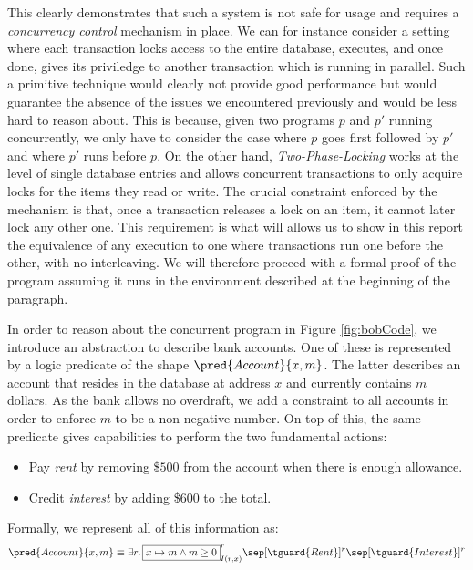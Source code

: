 This clearly demonstrates that such a system is not safe for usage and requires a \textit{concurrency control} mechanism in place. We can for instance consider a setting where each transaction locks access to the entire database, executes, and once done, gives its priviledge to another transaction which is running in parallel. Such a primitive technique would clearly not provide good performance but would guarantee the absence of the issues we encountered previously and would be less hard to reason about. This is because, given two programs $p$ and $p'$ running concurrently, we only have to consider the case where $p$ goes first followed by $p'$ and where $p'$ runs before $p$. On the other hand, \textit{Two-Phase-Locking} works at the level of single database entries and allows concurrent transactions to only acquire locks for the items they read or write. The crucial constraint enforced by the mechanism is that, once a transaction releases a lock on an item, it cannot later lock any other one. This requirement is what will allows us to show in this report the equivalence of any execution to one where transactions run one before the other, with no interleaving. We will therefore proceed with a formal proof of the program assuming it runs in the environment described at the beginning of the paragraph.

In order to reason about the concurrent program in Figure \ref{fig:bobCode}, we introduce an abstraction to describe bank accounts. One of these is represented by a logic predicate of the shape $\pred{Account}{x, m}$. The latter describes an account that resides in the database at address $x$ and currently contains $m$ dollars. As the bank allows no overdraft, we add a constraint to all accounts in order to enforce $m$ to be a non-negative number. On top of this, the same predicate gives capabilities to perform the two fundamental actions:
\begin{itemize}
	\item Pay \textit{rent} by removing \$$500$ from the account when there is enough allowance.
	
	\item Credit \textit{interest} by adding \$$600$ to the total.
\end{itemize}
Formally, we represent all of this information as:
\[
	\pred{Account}{x, m}
		\equiv
	\exists r \ldotp \boxed{x \mapsto m \land m \geq 0}^r_{I(r, x)}
	\sep [\tguard{Rent}]^r \sep [\tguard{Interest}]^r
\]

